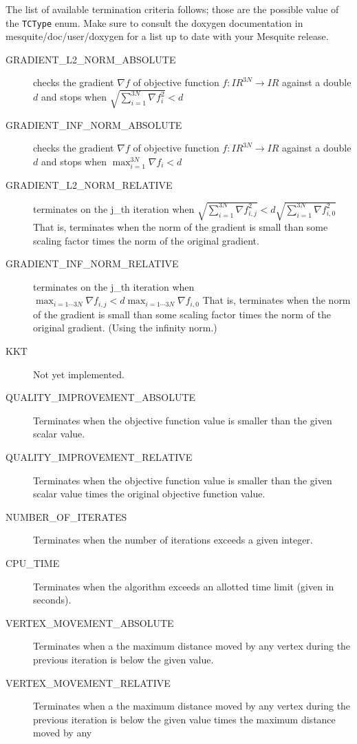 The list of available termination criteria follows; those are the possible value of the
\texttt{TCType} enum. Make sure to consult the doxygen documentation
in mesquite/doc/user/doxygen for a list up to date with your Mesquite release. 
\begin{description}
\item[GRADIENT\_\-L2\_\-NORM\_\-ABSOLUTE] checks the gradient $\nabla f $ of objective function  $f
: I\!\!R^{3N} \rightarrow I\!\!R $ against a double $d$  and stops when $\sqrt{\sum_{i=1}^{3N}\nabla
f_i^2}<d$
\item[GRADIENT\_\-INF\_\-NORM\_\-ABSOLUTE]
checks the gradient $\nabla f $ of objective function  $f : I\!\!R^{3N} \rightarrow I\!\!R $ against
a double $d$  and stops when $ \max_{i=1}^{3N} \nabla f_i < d $ 
\item[GRADIENT\_\-L2\_\-NORM\_\-RELATIVE]terminates on the j\_\-th iteration when
$\sqrt{\sum_{i=1}^{3N}\nabla f_{i,j}^2}<d\sqrt{\sum_{i=1}^{3N}\nabla f_{i,0}^2}$ That is, terminates
when the norm of the gradient is small than some scaling factor times the norm of the original
gradient. 
\item[GRADIENT\_\-INF\_\-NORM\_\-RELATIVE]terminates on the j\_\-th iteration when $\max_{i=1 \cdots
3N}\nabla f_{i,j}<d \max_{i=1 \cdots 3N}\nabla f_{i,0}$ That is, terminates when the norm of the
gradient is small than some scaling factor times the norm of the original gradient. (Using the
infinity norm.) 
\item[KKT] Not yet implemented.
\item[QUALITY\_\-IMPROVEMENT\_\-ABSOLUTE] Terminates when the objective function value is smaller
than the given scalar value.
\item[QUALITY\_\-IMPROVEMENT\_\-RELATIVE] Terminates when the objective function value is smaller
than the given scalar value times the original objective function value. 
\item[NUMBER\_\-OF\_\-ITERATES] Terminates when the number of iterations exceeds a given integer.
\item[CPU\_\-TIME] Terminates when the algorithm exceeds an allotted time limit (given in seconds). 
\item[VERTEX\_\-MOVEMENT\_\-ABSOLUTE] Terminates when a the maximum distance moved by any vertex
during the previous iteration is below the given value. 
\item[VERTEX\_\-MOVEMENT\_\-RELATIVE] Terminates when a the maximum distance moved by any vertex
during the previous iteration is below the given value times the maximum distance moved by any

\end{description}
